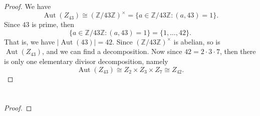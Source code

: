 \documentclass[12pt]{article}
\newcommand{\Z}{\mathbb{Z}}
\newcommand{\Aut}{\operatorname{Aut}}
\newcommand{\<}{\left\langle}
\renewcommand{\>}{\right\rangle}
\newcommand{\isom}{\cong}
\begin{document}
\section{}

\begin{proof}
    We have
    \[
        \Aut(Z_{43}) \isom (\Z/43\Z)^\times = \{a \in \Z/43\Z : (a, 43) = 1\}.
    \]
    Since $43$ is prime, then 
    \[
        \{a \in \Z/43\Z : (a, 43) = 1\} = \{1, \dots, 42\}.
    \]
    That is, we have $|\Aut(43)| = 42$. Since $(\Z/43\Z)^\times$ is abelian, so is $\Aut(Z_{43})$, and we can find a decomposition. Now since $42 = 2 \cdot 3 \cdot 7$, then there is only one elementary divisor decomposition, namely
    \[
        \Aut(Z_{43}) \isom Z_2 \times Z_3 \times Z_7 \isom Z_{42}.
    \]
    
\end{proof}

\newpage
\section{}

\subsection{}

\begin{proof}
    
    
\end{proof}
\end{document}
